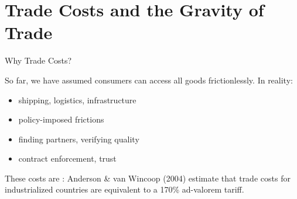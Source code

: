 \documentclass{beamer}
\begin{document}

\section{Trade Costs and the Gravity of Trade}

\begin{frame}{Why Trade Costs?}

    So far, we have assumed consumers can access all goods frictionlessly. In reality:

    \vspace{0.5em}
    \begin{itemize}
        \item {} shipping, logistics, infrastructure
        \item {} policy-imposed frictions
        \item {} finding partners, verifying quality
        \item {} contract enforcement, trust
    \end{itemize}

    \vspace{0.5em}
    These costs are : Anderson \& van Wincoop (2004) estimate that trade costs for industrialized countries are equivalent to a 170\% ad-valorem tariff.

    \vspace{0.3em}

\end{frame}
\end{document}
